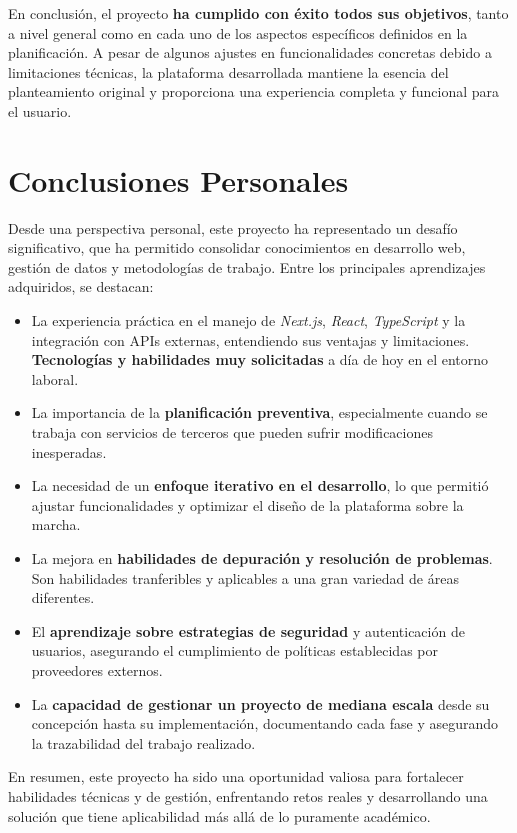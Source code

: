 En conclusión, el proyecto \textbf{ha cumplido con éxito todos sus objetivos}, tanto a nivel general como en cada uno de los aspectos específicos definidos en la planificación. A pesar de algunos ajustes en funcionalidades concretas debido a limitaciones técnicas, la plataforma desarrollada mantiene la esencia del planteamiento original y proporciona una experiencia completa y funcional para el usuario.

\section{Conclusiones Personales}

Desde una perspectiva personal, este proyecto ha representado un desafío significativo, que ha permitido consolidar conocimientos en desarrollo web, gestión de datos y metodologías de trabajo. Entre los principales aprendizajes adquiridos, se destacan:

\begin{itemize}
    \item La experiencia práctica en el manejo de \textit{Next.js}, \textit{React}, \textit{TypeScript} y la integración con APIs externas, entendiendo sus ventajas y limitaciones. \textbf{Tecnologías y habilidades muy solicitadas} a día de hoy en el entorno laboral.
    \item La importancia de la \textbf{planificación preventiva}, especialmente cuando se trabaja con servicios de terceros que pueden sufrir modificaciones inesperadas.
    \item La necesidad de un \textbf{enfoque iterativo en el desarrollo}, lo que permitió ajustar funcionalidades y optimizar el diseño de la plataforma sobre la marcha.
    \item La mejora en \textbf{habilidades de depuración y resolución de problemas}. Son habilidades tranferibles y aplicables a una gran variedad de áreas diferentes.
    \item El \textbf{aprendizaje sobre estrategias de seguridad} y autenticación de usuarios, asegurando el cumplimiento de políticas establecidas por proveedores externos.
    \item La \textbf{capacidad de gestionar un proyecto de mediana escala} desde su concepción hasta su implementación, documentando cada fase y asegurando la trazabilidad del trabajo realizado.
\end{itemize}

En resumen, este proyecto ha sido una oportunidad valiosa para fortalecer habilidades técnicas y de gestión, enfrentando retos reales y desarrollando una solución que tiene aplicabilidad más allá de lo puramente académico.


